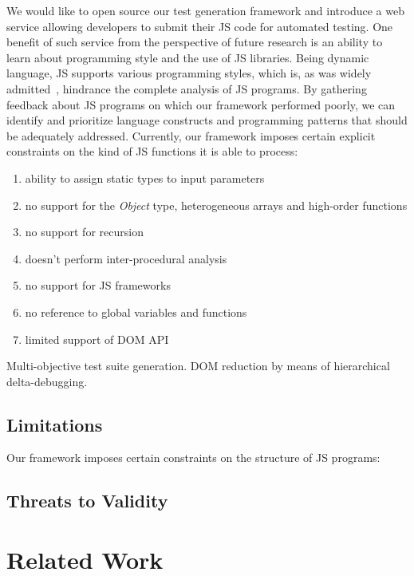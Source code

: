 \documentclass[sigconf,review, anonymous]{acmart}
\begin{document}
We would like to open source our test generation framework and introduce a web service allowing developers to submit their JS code for automated testing. One benefit of such service from the perspective of future research is an ability to learn about programming style and the use of JS libraries. Being dynamic language, JS supports various programming styles, which is, as was widely admitted~\cite{paper}, hindrance the complete analysis of JS programs. By gathering feedback about JS programs on which our framework performed poorly, we can identify and prioritize language constructs and programming patterns that should be adequately addressed. Currently, our framework imposes certain explicit constraints on the kind of JS functions it is able to process: 
\begin{enumerate}
\item ability to assign static types to input parameters 
\item no support for the \emph{Object} type, heterogeneous arrays and high-order functions
\item no support for recursion
\item doesn't perform inter-procedural analysis
\item no support for JS frameworks
\item no reference to global variables and functions
\item limited support of DOM API     
\end{enumerate}

Multi-objective test suite generation. DOM reduction by means of hierarchical delta-debugging.

\subsection{Limitations}
\label{sub.sec.eval.limit}

Our framework imposes certain constraints on the structure of JS programs:



\subsection{Threats to Validity}
\label{sub.sec.thhreats}

\section{Related Work}
\label{sec:related.work}
\end{document}
